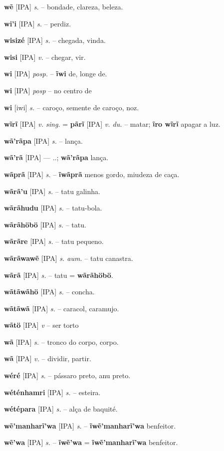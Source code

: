 \textbf{wẽ} [IPA] \textit{s.} -- bondade, clareza, beleza.

\textbf{wi'i} [IPA] \textit{s.} -- perdiz.

\textbf{wisizé} [IPA] \textit{s.} -- chegada, vinda.

\textbf{wisi} [IPA] \textit{v.} -- chegar, vir.

\textbf{wi} [IPA] \textit{posp.} -- \textbf{ĩwi} de, longe de.

\textbf{wi} [IPA] \textit{posp} -- {no centro de}

\textbf{wi} [iwi] \textit{s.} -- caroço, semente de caroço, noz.

\textbf{wĩrĩ} [IPA] \textit{v. sing.} = \textbf{pãrĩ} [IPA] \textit{v. du.} -- matar; \textbf{ĩro wĩrĩ} apagar a luz.

\textbf{wã'rãpa} [IPA] \textit{s.} -- lança.

\textbf{wã'rã} [IPA] \textit{} --- ..; \textbf{wã'rãpa} lança.

\textbf{wãprã} [IPA] \textit{s.} -- \textbf{ĩwãprã} menos gordo, miudeza de caça.

\textbf{wãrã'u} [IPA] \textit{s.} -- tatu galinha.

\textbf{wãrãhudu} [IPA] \textit{s.} -- tatu-bola.

\textbf{wãrãhöbö} [IPA] \textit{s.} -- tatu.

\textbf{wãrãre} [IPA] \textit{s.} -- tatu pequeno.

\textbf{wãrãwawẽ} [IPA] \textit{s. aum.} -- tatu canastra.

\textbf{wãrã} [IPA] \textit{s.} -- tatu = \textbf{wãrãhöbö}.

\textbf{wãtãwãhö} [IPA] \textit{s.} -- concha.

\textbf{wãtãwã} [IPA] \textit{s.} -- caracol, caramujo.

\textbf{wãtö} [IPA] \textit{v} -- {ser torto}

\textbf{wã} [IPA] \textit{s.} -- tronco do corpo, corpo.

\textbf{wã} [IPA] \textit{v.} -- dividir, partir.

\textbf{wéré} [IPA] \textit{s.} -- pássaro preto, anu preto.

\textbf{wéténhamri} [IPA] \textit{s.} -- esteira.

\textbf{wétépara} [IPA] \textit{s.} -- alça de baquité.

\textbf{wẽ'manharĩ'wa} [IPA] \textit{s.} -- \textbf{ĩwẽ'manharĩ'wa} benfeitor.

\textbf{wẽ'wa} [IPA] \textit{s.} -- \textbf{ĩwẽ'wa} = \textbf{ĩwẽ'manharĩ'wa} benfeitor.

